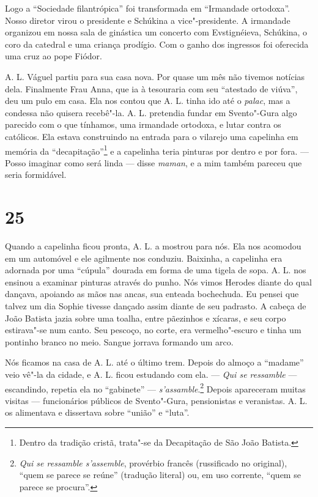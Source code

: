 Logo a ``Sociedade filantrópica'' foi transformada em ``Irmandade
ortodoxa''. Nosso diretor virou o presidente e Schúkina a
vice"-presidente. A irmandade organizou em nossa sala de ginástica um
concerto com Evstignéieva, Schúkina, o coro da catedral e uma criança
prodígio. Com o ganho dos ingressos foi oferecida uma cruz ao pope
Fiódor.

A. L. Váguel partiu para sua casa nova. Por quase um mês não tivemos
notícias dela. Finalmente Frau Anna, que ia à tesouraria com seu
``atestado de viúva'', deu um pulo em casa. Ela nos contou que A. L.
tinha ido até o \emph{palac}, mas a condessa não quisera recebê"-la. A.
L. pretendia fundar em Svento"-Gura algo parecido com o que tínhamos, uma
irmandade ortodoxa, e lutar contra os católicos. Ela estava construindo
na entrada para o vilarejo uma capelinha em memória da
``decapitação''\footnote{Dentro da tradição cristã, trata"-se da
  Decapitação de São João Batista.} e a capelinha teria pinturas por
dentro e por fora. --- Posso imaginar como será linda --- disse
\emph{maman}, e a mim também pareceu que seria formidável.

\section{25}

Quando a capelinha ficou pronta, A. L. a mostrou para nós. Ela nos
acomodou em um automóvel e ele agilmente nos conduziu. Baixinha, a
capelinha era adornada por uma ``cúpula'' dourada em forma de uma tigela
de sopa. A. L. nos ensinou a examinar pinturas através do punho. Nós
vimos Herodes diante do qual dançava, apoiando as mãos nas ancas, sua
enteada bochechuda. Eu pensei que talvez um dia Sophie tivesse dançado
assim diante de seu padrasto. A cabeça de João Batista jazia sobre uma
toalha, entre pãezinhos e xícaras, e seu corpo estirava"-se num canto.
Seu pescoço, no corte, era vermelho"-escuro e tinha um pontinho branco no
meio. Sangue jorrava formando um arco.

Nós ficamos na casa de A. L. até o último trem. Depois do almoço a
``madame'' veio vê"-la da cidade, e A. L. ficou estudando com ela. ---
\emph{Qui se ressamble} --- escandindo, repetia ela no ``gabinete'' ---
\emph{s'assamble}.\footnote{\emph{Qui se ressamble s'assemble}, %
  provérbio francês (russificado no original), ``quem se parece se
  reúne'' (tradução literal) ou, em uso corrente, ``quem se parece se
  procura''.} Depois apareceram muitas visitas --- funcionários públicos
de Svento"-Gura, pensionistas e veranistas. A. L. os alimentava e
dissertava sobre ``união'' e ``luta''.

